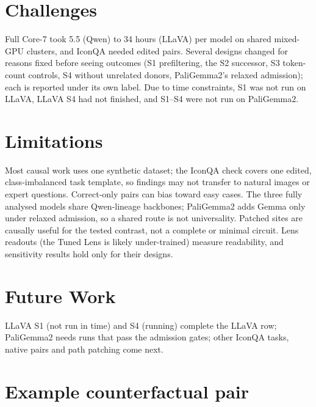 \documentclass[11pt]{article}
\begin{document}
\section*{Challenges}

Full Core-7 took 5.5 (Qwen) to 34 hours (LLaVA) per model on shared mixed-GPU clusters, and IconQA needed edited pairs. Several designs changed for reasons fixed before seeing outcomes (S1 prefiltering, the S2 successor, S3 token-count controls, S4 without unrelated donors, PaliGemma2's relaxed admission); each is reported under its own label. Due to time constraints, S1 was not run on LLaVA, LLaVA S4 had not finished, and S1--S4 were not run on PaliGemma2.

\section*{Limitations}

Most causal work uses one synthetic dataset; the IconQA check covers one edited, class-imbalanced task template, so findings may not transfer to natural images or expert questions. Correct-only pairs can bias toward easy cases. The three fully analysed models share Qwen-lineage backbones; PaliGemma2 adds Gemma only under relaxed admission, so a shared route is not universality. Patched sites are causally useful for the tested contrast, not a complete or minimal circuit. Lens readouts (the Tuned Lens is likely under-trained) measure readability, and sensitivity results hold only for their designs.

\section*{Future Work}

LLaVA S1 (not run in time) and S4 (running) complete the LLaVA row; PaliGemma2 needs runs that pass the admission gates; other IconQA tasks, native pairs and path patching come next.

\setlength{\bibsep}{0pt}


\clearpage
\appendix

\section{Example counterfactual pair}
\label{app:example}
\end{document}
